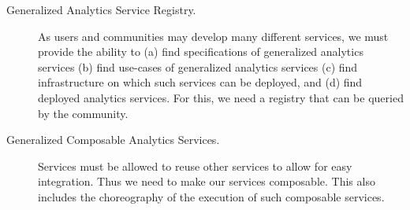 \begin{description}
  
\item[Generalized Analytics Service Registry.] As users and communities may develop many different services, we must provide the ability to  (a) find
specifications of generalized analytics services (b) find use-cases
of generalized analytics services (c) find infrastructure on which
such services can be deployed, and (d) find deployed analytics
services. For this, we need a registry that can be queried by the community.

\item[Generalized Composable Analytics Services.] Services must be allowed to reuse other services to allow for easy integration. Thus we need to make our services composable. This also includes the choreography of the execution of such composable services.




\end{description}
